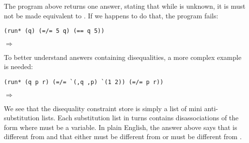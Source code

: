 The program above returns one answer, stating that while  is unknown, it is must not be made equivalent to . If we happens to do that, the program fails:
\begin{lstlisting}
(run* (q) (=/= 5 q) (== q 5))
\end{lstlisting}
$\Rightarrow$ \code{()}

To better understand answers containing disequalities, a more complex example is needed:
\begin{lstlisting}
(run* (q p r) (=/= `(,q ,p) `(1 2)) (=/= p r))
\end{lstlisting}
$\Rightarrow$ 

We see that the disequality constraint store is simply a list of mini anti-substitution lists. Each substitution list in turns contains disassociations of the form  where  must be a variable. In plain English, the answer above says that  is different from  and that either  must be different from  or  must be different from .
